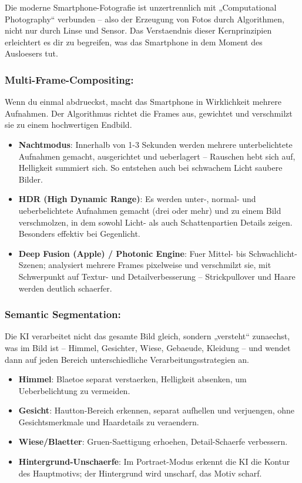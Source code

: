 
Die moderne Smartphone-Fotografie ist unzertrennlich mit „Computational Photography“ verbunden – also der Erzeugung von Fotos durch Algorithmen, nicht nur durch Linse und Sensor. Das Verstaendnis dieser Kernprinzipien erleichtert es dir zu begreifen, was das Smartphone in dem Moment des Ausloesers tut.

\subsubsection*{Multi-Frame-Compositing:}

Wenn du einmal abdrueckst, macht das Smartphone in Wirklichkeit mehrere Aufnahmen. Der Algorithmus richtet die Frames aus, gewichtet und verschmilzt sie zu einem hochwertigen Endbild.

\begin{itemize}
  \item \textbf{Nachtmodus}: Innerhalb von 1-3 Sekunden werden mehrere unterbelichtete Aufnahmen gemacht, ausgerichtet und ueberlagert – Rauschen hebt sich auf, Helligkeit summiert sich. So entstehen auch bei schwachem Licht saubere Bilder.
  \item \textbf{HDR (High Dynamic Range)}: Es werden unter-, normal- und ueberbelichtete Aufnahmen gemacht (drei oder mehr) und zu einem Bild verschmolzen, in dem sowohl Licht- als auch Schattenpartien Details zeigen. Besonders effektiv bei Gegenlicht.
  \item \textbf{Deep Fusion (Apple) / Photonic Engine}: Fuer Mittel- bis Schwachlicht-Szenen; analysiert mehrere Frames pixelweise und verschmilzt sie, mit Schwerpunkt auf Textur- und Detailverbesserung – Strickpullover und Haare werden deutlich schaerfer.
\end{itemize}

\subsubsection*{Semantic Segmentation:}

Die KI verarbeitet nicht das gesamte Bild gleich, sondern „versteht“ zunaechst, was im Bild ist – Himmel, Gesichter, Wiese, Gebaeude, Kleidung – und wendet dann auf jeden Bereich unterschiedliche Verarbeitungsstrategien an.

\begin{itemize}
  \item \textbf{Himmel}: Blaetoe separat verstaerken, Helligkeit absenken, um Ueberbelichtung zu vermeiden.
  \item \textbf{Gesicht}: Hautton-Bereich erkennen, separat aufhellen und verjuengen, ohne Gesichtsmerkmale und Haardetails zu veraendern.
  \item \textbf{Wiese/Blaetter}: Gruen-Saettigung erhoehen, Detail-Schaerfe verbessern.
  \item \textbf{Hintergrund-Unschaerfe}: Im Portraet-Modus erkennt die KI die Kontur des Hauptmotivs; der Hintergrund wird unscharf, das Motiv scharf.
\end{itemize}

